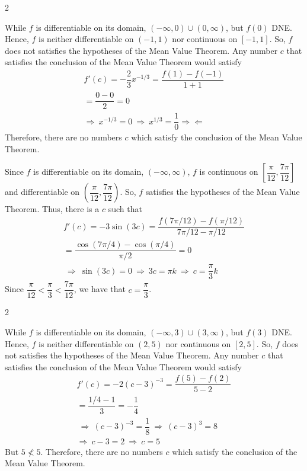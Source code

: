 \documentclass{book}
\begin{document}
\begin{appendices}
\begin{enumerate}[!HW!]
\begin{multicols}{2}
\begin{pf}
While $f$ is differentiable on its domain, $(-\infty, 0)\cup (0,\infty)$, but $f(0)$ DNE. Hence, $f$ is neither differentiable on $(-1,1)$ nor continuous on $[-1,1]$. So, $f$ does not satisfies the hypotheses of the Mean Value Theorem. Any number $c$ that satisfies the conclusion of the Mean Value Theorem would satisfy
\begin{multline*}
f'(c) = -\dfrac{2}{3}x^{-1/3}= \dfrac{f(1) - f(-1)}{1+1}\\=\dfrac{0-0}{2} = 0\\
\Rightarrow\ x^{-1/3} = 0 \ \Rightarrow\ x^{1/3} = \dfrac{1}{0} \Rightarrow\Leftarrow
\end{multline*} Therefore, there are no numbers $c$ which satisfy the conclusion of the Mean Value Theorem.
\end{pf}\columnbreak

\itemspade \mbox{}\vspace{-25pt}

\begin{pf}
Since $f$ is differentiable on its domain, $(-\infty, \infty)$, $f$ is continuous on $\left[\dfrac{\pi}{12},\dfrac{7\pi}{12}\right]$ and differentiable on $\left(\dfrac{\pi}{12},\dfrac{7\pi}{12}\right)$. So, $f$ satisfies the hypotheses of the Mean Value Theorem. Thus, there is a $c$ such that 
\begin{multline*}
f'(c)=-3\sin(3c) = \dfrac{f(7\pi/12) - f(\pi/12)}{7\pi/12-\pi/12}\\=\dfrac{\cos(7\pi/4)-\cos(\pi/4)}{\pi/2} = 0\\
\ \Rightarrow\ \sin(3c) = 0 \ \Rightarrow\ 3c = \pi k \ \Rightarrow\ c= \dfrac{\pi}{3}k
\end{multline*} Since $ \dfrac{\pi}{12} < \dfrac{\pi}{3} <  \dfrac{7\pi}{12}$, we have that $c=  \dfrac{\pi}{3}$.
\end{pf}
\end{multicols}\pagebreak

\begin{multicols}{2}
\itemspade \mbox{}\vspace{-25pt}

\begin{pf}
While $f$ is differentiable on its domain, $(-\infty, 3)\cup (3,\infty)$, but $f(3)$ DNE. Hence, $f$ is neither differentiable on $(2,5)$ nor continuous on $[2,5]$. So, $f$ does not satisfies the hypotheses of the Mean Value Theorem. Any number $c$ that satisfies the conclusion of the Mean Value Theorem would satisfy
\begin{multline*}
f'(c)=-2(c-3)^{-3} =\dfrac{f(5) - f(2)}{5-2}\\ = \dfrac{1/4-1}{3} = -\dfrac{1}{4}\\
\ \Rightarrow\ (c-3)^{-3} = \dfrac{1}{8} \ \Rightarrow\ (c-3)^3=8 \\ \Rightarrow\ c-3 = 2 \ \Rightarrow\ c = 5
\end{multline*} But $5\not< 5$. Therefore, there are no numbers $c$ which satisfy the conclusion of the Mean Value Theorem.
\end{pf}\columnbreak


\end{multicols}
\end{enumerate}
\end{appendices}
\end{document}
